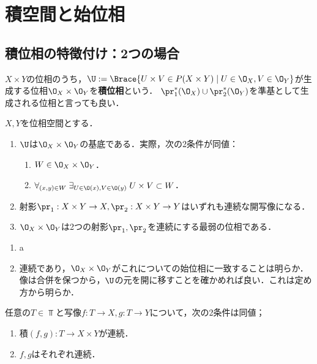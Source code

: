 \documentclass[uplatex,dvipdfmx]{jsreport}
\begin{document}
\section{積空間と始位相}

\subsection{積位相の特徴付け：2つの場合}

\begin{definition}
    $X\times Y$の位相のうち，$\U:=\Brace{U\times V\in P(X\times Y)\mid U\in\O_X,V\in\O_Y}$が生成する位相$\O_X\times\O_Y$を\textbf{積位相}という．
    $\pr_1^*(\O_X)\cup\pr_2^*(\O_Y)$を準基として生成される位相と言っても良い．
\end{definition}

\begin{proposition}[積位相の特徴付け]
    $X,Y$を位相空間とする．
    \begin{enumerate}
        \item $\U$は$\O_X\times\O_Y$の基底である．実際，次の2条件が同値：
        \begin{enumerate}
            \item $W\in\O_X\times\O_Y$．
            \item $\forall_{(x,y)\in W}\;\exists_{U\in\O(x),V\in\O(y)}\;U\times V\subset W$．
        \end{enumerate}
        \item 射影$\pr_1:X\times Y\to X,\pr_2:X\times Y\to Y$はいずれも連続な開写像になる．
        \item $\O_X\times\O_Y$は2つの射影$\pr_1,\pr_2$を連続にする最弱の位相である．
    \end{enumerate}
\end{proposition}
\begin{Proof}\mbox{}
    \begin{enumerate}
        \item a
        \item 連続であり，$\O_X\times\O_Y$がこれについての始位相に一致することは明らか．像は合併を保つから，$\U$の元を開に移すことを確かめれば良い．これは定め方から明らか．
    \end{enumerate}
\end{Proof}

\begin{proposition}[積写像の連続性の特徴付け]
    任意の$T\in\Top$と写像$f:T\to X,g:T\to Y$について，次の2条件は同値；
    \begin{enumerate}
        \item 積$(f,g):T\to X\times Y$が連続．
        \item $f,g$はそれぞれ連続．
    \end{enumerate}
\end{proposition}
\end{document}
